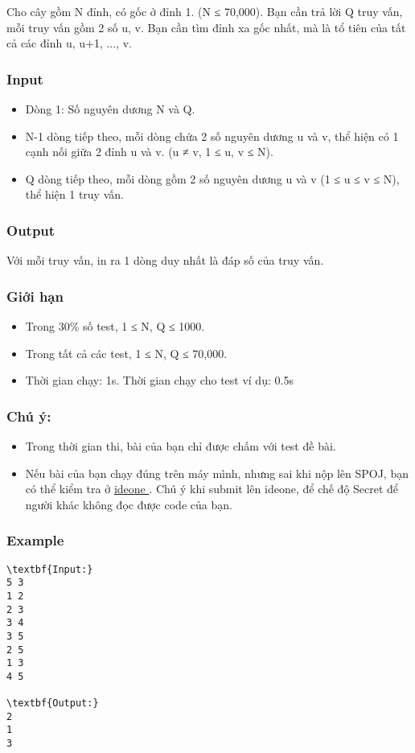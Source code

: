 



   Cho cây gồm N đỉnh, có gốc ở đỉnh 1. (N ≤ 70,000). Bạn cần trả lời Q truy vấn, mỗi truy vấn gồm 2 số u, v. Bạn cần tìm đỉnh xa gốc nhất, mà là tổ tiên của tất cả các đỉnh u, u+1, ..., v.  

\subsubsection{   Input  }
\begin{itemize}
	\item      Dòng 1: Số nguyên dương N và Q.    
	\item      N-1 dòng tiếp theo, mỗi dòng chứa 2 số nguyên dương u và v, thể hiện có 1 cạnh nối giữa 2 đỉnh u và v. (u ≠ v, 1 ≤ u, v ≤ N).    
	\item      Q dòng tiếp theo, mỗi dòng gồm 2 số nguyên dương u và v (1 ≤ u ≤ v ≤ N), thể hiện 1 truy vấn.    
\end{itemize}

\subsubsection{   Output  }

   Với mỗi truy vấn, in ra 1 dòng duy nhất là đáp số của truy vấn.  

\subsubsection{   Giới hạn  }
\begin{itemize}
	\item     Trong 30\% số test, 1 ≤ N, Q ≤ 1000.   
	\item     Trong tất cả các test, 1 ≤ N, Q ≤ 70,000.   
	\item     Thời gian chạy: 1s. Thời gian chạy cho test ví dụ: 0.5s   
\end{itemize}

\subsubsection{   Chú ý:  }
\begin{itemize}
	\item     Trong thời gian thi, bài của bạn chỉ được chấm với test đề bài.   
	\item     Nếu bài của bạn chạy đúng trên máy mình, nhưng sai khi nộp lên SPOJ, bạn có thể kiểm tra ở    \href{https://ideone.com}{     ideone    }    . Chú ý khi submit lên ideone, để chế độ Secret để người khác không đọc được code của bạn.   
\end{itemize}

\subsubsection{   Example  }
\begin{verbatim}
\textbf{Input:}
5 3
1 2
2 3
3 4
3 5
2 5
1 3
4 5

\textbf{Output:}
2
1
3
\end{verbatim}